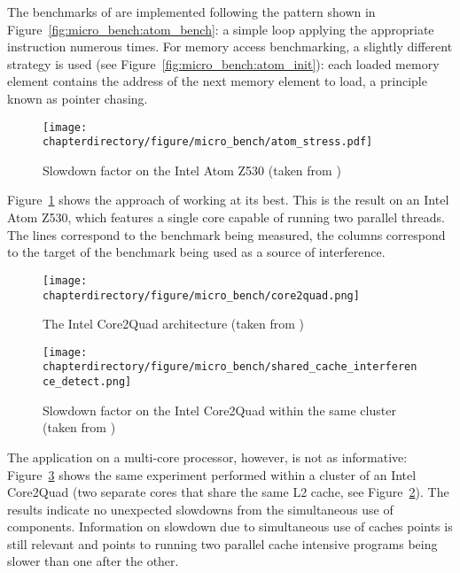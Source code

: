 The benchmarks of \cite{10.1145/2086696.2086713} are implemented following the
pattern shown in Figure~\ref{fig:micro_bench:atom_bench}: a simple loop applying
the appropriate instruction numerous times. For memory access benchmarking, a
slightly different strategy is used (see
Figure~\ref{fig:micro_bench:atom_init}): each loaded memory element contains the
address of the next memory element to load, a principle known as pointer
chasing.

\begin{figure}[hbt!]
\begin{center}
\texttt{[image: \\chapterdirectory/figure/micro\_bench/atom\_stress.pdf]}
\end{center}
\caption{Slowdown factor on the Intel Atom Z530 (taken from \cite{10.1145/2086696.2086713})}%
\label{fig:micro_bench:atom_stress}
\end{figure}

Figure~\ref{fig:micro_bench:atom_stress} shows the approach of
\cite{10.1145/2086696.2086713} working at its best. This is the result on an
Intel Atom Z530, which features a single core capable of running two parallel
threads. The lines correspond to the benchmark being measured, the columns
correspond to the target of the benchmark being used as a source of
interference.

\begin{figure}[hbt!]
\begin{center}
\texttt{[image: \\chapterdirectory/figure/micro\_bench/core2quad.png]}
\end{center}
\caption{The Intel Core2Quad architecture (taken
from \cite{10.1145/2086696.2086713})}%
\label{fig:micro_bench:core2quad}
\end{figure}

\begin{figure}[hbt!]
\begin{center}
\texttt{[image: \\chapterdirectory/figure/micro\_bench/shared\_cache\_interference\_detect.png]}
\end{center}
\caption{Slowdown factor on the Intel Core2Quad within the same cluster (taken
from \cite{10.1145/2086696.2086713})}%
\label{fig:micro_bench:core2quad_stress}
\end{figure}

The application on a multi-core processor, however, is not as informative:
Figure~\ref{fig:micro_bench:core2quad_stress} shows the same experiment
performed within a cluster of an Intel Core2Quad (two separate cores that share
the same L2 cache, see Figure~\ref{fig:micro_bench:core2quad}). The results
indicate no unexpected slowdowns from the simultaneous use of components.
Information on slowdown due to simultaneous use of caches points is still
relevant and points to running two parallel cache intensive programs being
slower than one after the other.

